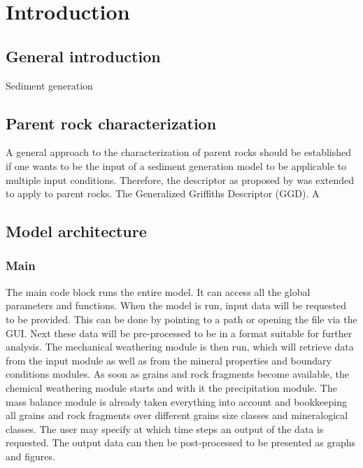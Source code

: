\chapter{Introduction}\label{ch:introduction}

\instructionsintroduction



\section{General introduction}
    Sediment generation


\section{Parent rock characterization}
    A general approach to the characterization of parent rocks should be established if one wants to be the input of a sediment generation model to be applicable to multiple input conditions. %
    Therefore, the descriptor as proposed by \cite{Griffiths_1952,Griffiths_1961} was extended to apply to parent rocks. %
    The Generalized Griffiths Descriptor (\gls{GGD}). %
    \gls{A}



\section{Model architecture}
    \subsection{Main}
    The main code block runs the entire model. %
    It can access all the global parameters and functions. %
    When the model is run, input data will be requested to be provided. %
    This can be done by pointing to a path or opening the file via the GUI. %
    Next these data will be pre-processed to be in a format suitable for further analysis. %
    The mechanical weathering module is then run, which will retrieve data from the input module as well {}as from the mineral properties and boundary conditions modules. %
    As soon as grains and rock fragments become available, the chemical weathering module starts and with it the precipitation module. %
    The mass balance module is already taken everything into account and bookkeeping all grains and rock fragments over different grains size classes and mineralogical classes. %
    The user may specify at which time steps an output of the data is requested. %
    The output data can then be post-processed to be presented as graphs and figures. %

